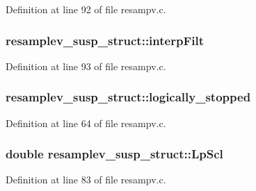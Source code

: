 Definition at line 92 of file resampv.\+c.

\subsubsection[{\texorpdfstring{interp\+Filt}{interpFilt}}]{ resamplev\+\_\+susp\+\_\+struct\+::interp\+Filt}\hypertarget{structresamplev__susp__struct_a841f3a7b47d2e3c5653fee314e9203f1}{}\label{structresamplev__susp__struct_a841f3a7b47d2e3c5653fee314e9203f1}


Definition at line 93 of file resampv.\+c.

\subsubsection[{\texorpdfstring{logically\+\_\+stopped}{logically_stopped}}]{ resamplev\+\_\+susp\+\_\+struct\+::logically\+\_\+stopped}\hypertarget{structresamplev__susp__struct_ac50c0598259f86ca40f2ce5de257570c}{}\label{structresamplev__susp__struct_ac50c0598259f86ca40f2ce5de257570c}


Definition at line 64 of file resampv.\+c.

\subsubsection[{\texorpdfstring{Lp\+Scl}{LpScl}}]{\setlength{\rightskip}{0pt plus 5cm}double resamplev\+\_\+susp\+\_\+struct\+::\+Lp\+Scl}\hypertarget{structresamplev__susp__struct_a857ef80887cec53fe13035faae37cdab}{}\label{structresamplev__susp__struct_a857ef80887cec53fe13035faae37cdab}


Definition at line 83 of file resampv.\+c.

